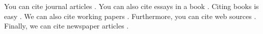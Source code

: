 \documentclass{article}
\begin{document}
You can cite journal articles \citep{journalarticle}. You can also cite essays in a book \citep{incollection}. Citing books is easy \citep{book}. We can also cite working papers \citep{workingpaper}. Furthermore, you can cite web sources \citep{webresource}. Finally, we can cite newspaper articles \citep{newsarticle}.



\end{document}
